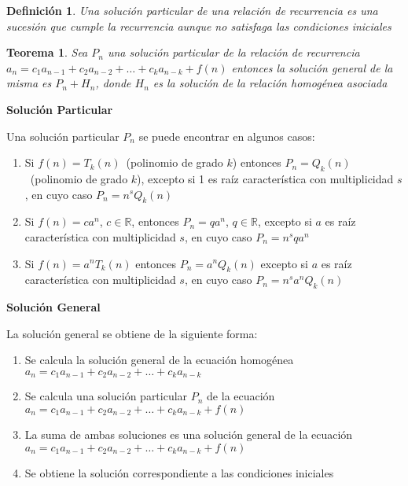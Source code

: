 \documentclass[a4paper,12pt]{report}
\newtheorem*{teo}{Teorema}
\newtheorem*{dfn}{Definición}
\begin{document}
\begin{dfn}
 Una solución particular de una relación de recurrencia es una sucesión que cumple la recurrencia aunque no satisfaga las condiciones iniciales
\end{dfn}

\begin{teo}
 Sea $P_n$ una solución particular de la relación de recurrencia\\ 
 $a_n=c_1a_{n-1}+c_2a_{n-2}+\dots+c_ka_{n-k}+f(n)$ entonces la solución general de la misma es
 $P_n+H_n$, donde $H_n$ es la solución de la relación homogénea asociada
\end{teo}

\textbf{Solución Particular}

Una solución particular $P_n$ se puede encontrar en algunos casos:

\begin{enumerate}
 \item Si $f(n)=T_k(n)$~(polinomio de grado $k$) entonces $P_n=Q_k(n)$~(polinomio de grado $k$), excepto si 1 es raíz característica con multiplicidad $s$, en cuyo caso $P_n=n^sQ_k(n)$
 \item Si $f(n)=ca^n$, $c\in\mathbb{R}$, entonces $P_n=qa^n$, $q\in\mathbb{R}$, excepto si $a$ es raíz característica con multiplicidad $s$, en cuyo caso $P_n=n^sqa^n$
 \item Si $f(n)=a^nT_k(n)$ entonces $P_n=a^nQ_k(n)$ excepto si $a$ es raíz característica con multiplicidad $s$, en cuyo caso $P_n=n^sa^nQ_k(n)$

\end{enumerate}


\textbf{Solución General}

La solución general se obtiene de la siguiente forma:

\begin{enumerate}
 \item Se calcula la solución general de la ecuación homogénea\\ 
 $a_n=c_1a_{n-1}+c_2a_{n-2}+\dots+c_ka_{n-k}$ 
 \item Se calcula una soluci\'on particular $P_n$ de la ecuación\\ 
 $a_n=c_1a_{n-1}+c_2a_{n-2}+\dots+c_ka_{n-k}+f(n)$ 
 \item La suma de ambas soluciones es una solución general de la ecuación\\
 $a_n=c_1a_{n-1}+c_2a_{n-2}+\dots+c_ka_{n-k}+f(n)$ 
 \item Se obtiene la solución correspondiente a las condiciones iniciales
 \end{enumerate}
 
\end{document}
